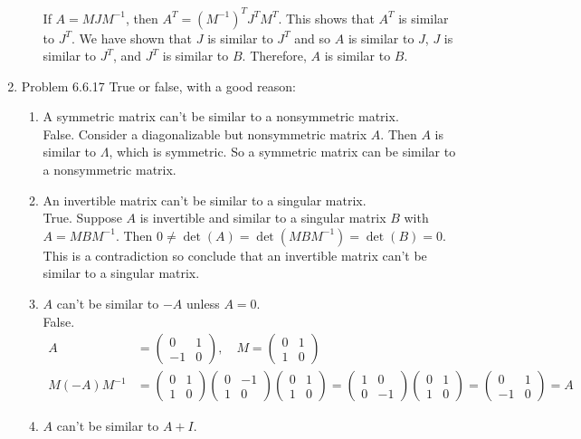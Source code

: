 \documentclass[a4paper]{article}
\begin{document}
\begin{enumerate}
\begin{enumerate}
	If $A = MJM^{-1}$, then $A^T = (M^{-1})^TJ^TM^T$. This shows
	that $A^T$ is similar to $J^T$. We have shown that $J$ is 
	similar to $J^T$ and so $A$ is similar to $J$, $J$ is 
	similar to $J^T$, and $J^T$ is similar to $B$. Therefore, 
	$A$ is similar to $B$. 
\end{enumerate}

\item{Problem 6.6.17} True or false, with a good reason: 
\begin{enumerate}
	\item 
	A symmetric matrix can't be similar to a nonsymmetric matrix.
	\\
	
	False. Consider a diagonalizable but nonsymmetric matrix
	$A$. Then $A$ is similar to $\Lambda$, which is symmetric. So
	a symmetric matrix can be similar to a nonsymmetric matrix.
	
	\item
	An invertible matrix can't be similar to a singular matrix.\\
	
	True. Suppose $A$ is invertible and similar to a singular
	matrix $B$ with $A = MBM^{-1}$. Then $0 \neq \det(A)
	= \det(MBM^{-1}) = \det(B) = 0$. This is a contradiction so
	conclude that an invertible matrix can't be similar to a 
	singular matrix. 
	
	\item
	$A$ can't be similar to $-A$ unless $A = 0$. \\
	
	False.
	\begin{align*}
	A &= \begin{pmatrix} 0 & 1 \\ -1 & 0 \end{pmatrix}, \quad
	M = \begin{pmatrix} 0 & 1 \\ 1 & 0 \end{pmatrix} \\
	M(-A)M^{-1} & = 
	\begin{pmatrix} 0 & 1 \\ 1 & 0 \end{pmatrix}
	\begin{pmatrix} 0 & -1 \\ 1 & 0 \end{pmatrix}
	\begin{pmatrix} 0 & 1 \\ 1 & 0 \end{pmatrix}
	= \begin{pmatrix} 1 & 0 \\ 0 & -1 \end{pmatrix}
	\begin{pmatrix} 0 & 1 \\ 1 & 0 \end{pmatrix}
	= \begin{pmatrix} 0 & 1 \\ -1 & 0 \end{pmatrix} = A
	\end{align*}
	\item
	$A$ can't be similar to $A + I$. \\
	

\end{enumerate}
\end{enumerate}
\end{document}
